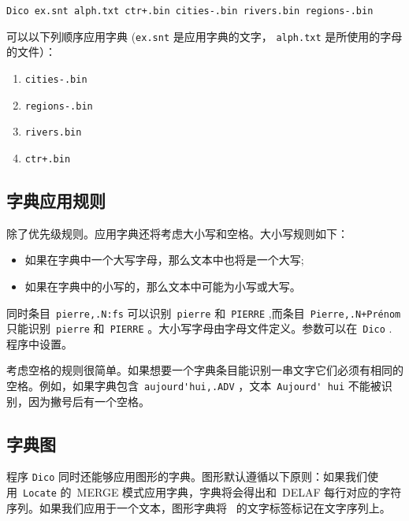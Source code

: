 \bigskip
\noindent
\verb$Dico ex.snt alph.txt ctr+.bin cities-.bin rivers.bin regions-.bin$

\bigskip \noindent 
可以以下列顺序应用字典 (\verb+ex.snt+ 是应用字典的文字， \verb+alph.txt+ 是所使用的字母的文件）：




\begin{enumerate}
  \item \verb$cities-.bin$
  \item \verb$regions-.bin$
  \item \verb$rivers.bin$
  \item \verb$ctr+.bin$
\end{enumerate}

\subsection{字典应用规则}
\label{section-transducer-application-rules}

除了优先级规则。应用字典还将考虑大小写和空格。大小写规则如下：


\begin{itemize}
  \item 如果在字典中一个大写字母，那么文本中也将是一个大写;

  \item 如果在字典中的小写的，那么文本中可能为小写或大写。

\end{itemize}

\noindent 
同时条目\ \verb$pierre,.N:fs$ 可以识别\ \verb+pierre+ 和\ \verb+PIERRE+ ,而条目\ \noindent \verb$Pierre,.N+Prénom$ 只能识别\ \verb+pierre+ 和\ \verb+PIERRE+ 。大小写字母由字母文件定义。参数可以在\ \verb+Dico+ . 程序中设置。


\bigskip
\noindent 
考虑空格的规则很简单。如果想要一个字典条目能识别一串文字它们必须有相同的空格。例如，如果字典包含\ \verb+aujourd'hui,.ADV+ ，文本\ \verb+Aujourd' hui+ 不能被识别，因为撇号后有一个空格。




\subsection{字典图}
\label{section-dictionary-graphs}
程序 \verb+Dico+ 同时还能够应用图形的字典。图形默认遵循以下原则：如果我们使用\ \verb+Locate+ 的\ MERGE 模式应用字典，字典将会得出和\ DELAF 每行对应的字符序列。如果我们应用于一个文本，图形字典将\  的文字标签标记在文字序列上。


